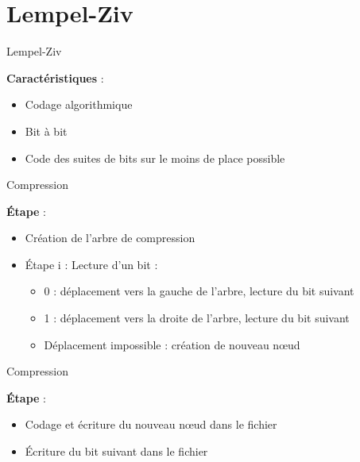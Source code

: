 \documentclass[french]{beamer}
\begin{document}
\section{Lempel-Ziv}
\begin{frame}{Lempel-Ziv}
	\begin{center}
	\textbf{Caractéristiques} :
	\begin{itemize}
	\item<2-4>  Codage algorithmique
	\item<3-4>  Bit à bit 
	\item<4>  Code des suites de bits sur le moins de place possible
	\end{itemize}
	\end{center}
\end{frame}


\begin{frame}{Compression}
	\begin{center}
	\textbf{Étape} :
	\begin{itemize}
	\item<2-6>  Création de l'arbre de compression
	\item<3-6>  Étape i : Lecture d'un bit :
			\begin{itemize}
				\item<4-6> 0 : déplacement vers la gauche de l'arbre, lecture du bit suivant
				\item<5-6> 1 : déplacement vers la droite de l'arbre, lecture du bit suivant
				\item<6-6> Déplacement impossible : création de nouveau nœud 
			\end{itemize}
	\end{itemize}
	\end{center}
\end{frame}
	
\begin{frame}{Compression}
	\begin{center}
	\textbf{Étape} :
	\begin{itemize}
	\item<1-2>  Codage et écriture du nouveau nœud dans le fichier
	\item<2> Écriture du bit suivant dans le fichier
	\end{itemize}
	\end{center}
\end{frame}
\end{document}
